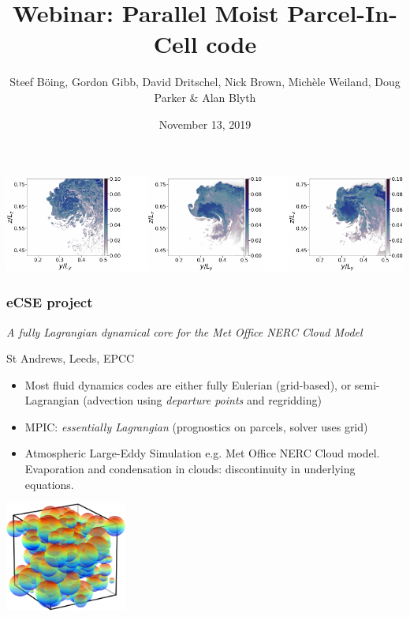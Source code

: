 \documentclass{beamer}
\title[MPIC]{Webinar: Parallel Moist Parcel-In-Cell code}
\author[B\"oing, Gibb, Dritschel, et al.]{{Steef B\"oing, Gordon Gibb, David Dritschel, Nick Brown, \newline Mich\`ele Weiland, Doug Parker \& Alan Blyth}\vspace{-0.5cm}}
\institute[]{{University of Leeds, University of St Andrews, EPCC}\vspace{-0.4cm}}
\date{November 13, 2019}
\begin{document}
\begin{frame}

\titlepage %

\vspace{-0.6cm}
\begin{center}
  \includegraphics[width = \textwidth]{pmpic_images/croppedfig_les.pdf}
\end{center}


\end{frame}

\begin{frame}

\tableofcontents
\end{frame}

\begin{frame}
\frametitle{eCSE project}
\textit{A fully Lagrangian dynamical core for the Met Office NERC Cloud Model}
\vspace{0.2cm}
\begin{center}
St Andrews, Leeds, EPCC
\end{center}

\vspace{0.1cm}
\begin{itemize}
\item Most fluid dynamics codes are either fully Eulerian (grid-based), or semi-Lagrangian (advection using \textit{departure points} and regridding)
\item MPIC: \textit{essentially Lagrangian} (prognostics on parcels, solver uses grid)
\item Atmospheric Large-Eddy Simulation e.g. Met Office NERC Cloud model. Evaporation and condensation in clouds: discontinuity in underlying equations.
\end{itemize}
\vspace{-0.8cm}

\begin{center}
  \includegraphics[width = 0.3\textwidth]{pmpic_images/parcels.pdf}
\end{center}

\end{frame}
\end{document}
